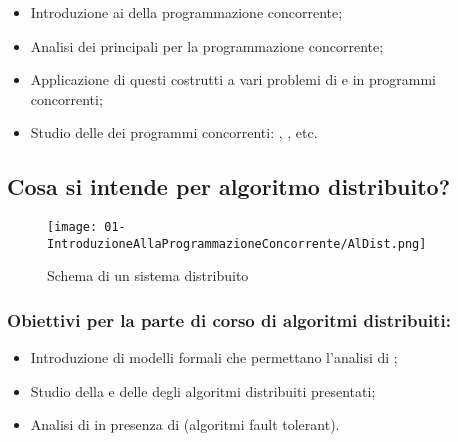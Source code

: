 \begin{itemize}
  \item Introduzione ai  della programmazione concorrente;
  \item Analisi dei principali  per la programmazione concorrente;
  \item Applicazione di questi costrutti a vari problemi di  e  in programmi concorrenti;
  \item Studio delle  dei programmi concorrenti: , , etc. 
\end{itemize}

\subsection{Cosa si intende per algoritmo distribuito?}



\begin{figure}[h]
    \centering
    \texttt{[image: 01-IntroduzioneAllaProgrammazioneConcorrente/AlDist.png]}
    \caption{Schema di un sistema distribuito}
\end{figure}

\subsubsection{Obiettivi per la parte di corso di algoritmi distribuiti:}

\begin{itemize}
\item Introduzione di modelli formali che permettano l'analisi di ;
\item Studio della  e delle  degli algoritmi distribuiti presentati;
\item Analisi di  in presenza di  (algoritmi fault tolerant).
\end{itemize}

